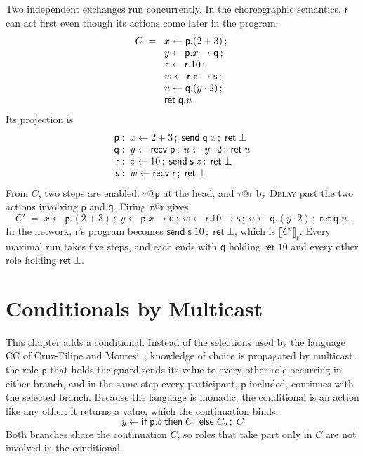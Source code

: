 \documentclass[11pt]{report}
\makeatletter
\theoremstyle{plain}
\theoremstyle{definition}
\theoremstyle{remark}
\newcommand{\kw}[1]{\mathsf{#1}}
\newcommand{\pp}{\mathsf{p}}
\newcommand{\qq}{\mathsf{q}}
\newcommand{\rr}{\mathsf{r}}
\newcommand{\sr}{\mathsf{s}}
\newcommand{\bind}[3]{#1 \leftarrow #2\,;\;#3}
\newcommand{\cret}[1]{\kw{ret}\;#1}
\newcommand{\com}[3]{#1.#2 \to #3}
\newcommand{\cif}[4]{\kw{if}\;#1.#2\;\kw{then}\;#3\;\kw{else}\;#4}
\newcommand{\tauat}[1]{\tau\mathord{@}#1}
\newcommand{\nsend}[2]{\kw{send}\;#1\;#2}
\newcommand{\nrecv}[1]{\kw{recv}\;#1}
\newcommand{\proj}[2]{\llbracket #1 \rrbracket_{#2}}
\newcommand{\rn}[1]{{\normalfont\scshape #1}}
\makeatother
\begin{document}
Two independent exchanges run concurrently.  In the choreographic semantics,
$\rr$ can act first even though its actions come later in the program.
\[
\begin{array}{r@{\;\;}l}
  C \;=\; & \bind{x}{\pp.(2+3)}{}\\
          & \bind{y}{\com{\pp}{x}{\qq}}{}\\
          & \bind{z}{\rr.10}{}\\
          & \bind{w}{\com{\rr}{z}{\sr}}{}\\
          & \bind{u}{\qq.(y\cdot 2)}{}\\
          & \cret{\qq.u}
\end{array}
\]
Its projection is
\[
\begin{array}{r@{\;\;}l}
  \pp: & x\leftarrow 2+3\,;\;\nsend{\qq}{x}\,;\;\kw{ret}\;\bot\\
  \qq: & y\leftarrow\nrecv{\pp}\,;\;u\leftarrow y\cdot 2\,;\;\kw{ret}\;u\\
  \rr: & z\leftarrow 10\,;\;\nsend{\sr}{z}\,;\;\kw{ret}\;\bot\\
  \sr: & w\leftarrow\nrecv{\rr}\,;\;\kw{ret}\;\bot
\end{array}
\]
From $C$, two steps are enabled: $\tauat{\pp}$ at the head, and $\tauat{\rr}$
by \rn{Delay} past the two actions involving $\pp$ and $\qq$.  Firing
$\tauat{\rr}$ gives
\[
  C' \;=\; \bind{x}{\pp.(2+3)}{\bind{y}{\com{\pp}{x}{\qq}}{\bind{w}{\com{\rr}{10}{\sr}}{\bind{u}{\qq.(y\cdot 2)}{\cret{\qq.u}}}}}.
\]
In the network, $\rr$'s program becomes $\nsend{\sr}{10}\,;\;\kw{ret}\;\bot$,
which is $\proj{C'}{\rr}$.  Every maximal run takes five steps, and
each ends with $\qq$ holding $\kw{ret}\;10$ and every other role holding
$\kw{ret}\;\bot$.

\chapter{Conditionals by Multicast}
\label{ch:cond}

This chapter adds a conditional.  Instead of the selections used by the
language CC of Cruz-Filipe and Montesi~\cite{cc}, knowledge of choice is
propagated by multicast: the role $\pp$ that holds the guard sends its value
to every other role occurring in either branch, and in the same step every
participant, $\pp$ included, continues with the selected branch.  Because the
language is monadic, the conditional is an action like any other: it returns
a value, which the continuation binds.
\[
  \bind{y}{\cif{\pp}{b}{C_1}{C_2}}{C}
\]
Both branches share the continuation $C$, so roles that take part only in
$C$ are not involved in the conditional.
\end{document}

